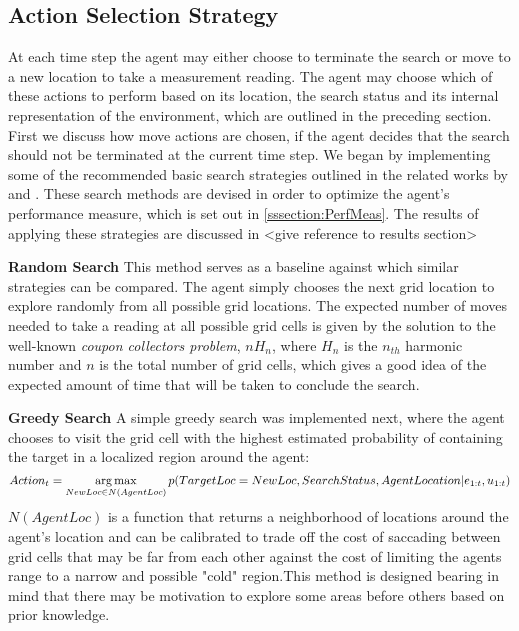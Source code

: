 \subsection{Action Selection Strategy}\label{subsubsec:ActionSelection}
\workinprogress
At each time step the agent may either choose to terminate the search or move to a new location to take a measurement reading. The agent may choose which of these actions to perform based on its location, the search status and its internal representation of the environment, which are outlined in the preceding section. First we discuss how move actions are chosen, if the agent decides that the search should not be terminated at the current time step. We began by implementing some of the recommended basic search strategies outlined in the related works by \citeauthor{Chung2007ASearchb} \cite{Chung2007ASearchb} and \citeauthor{Waharte2010SupportingRAVs} \cite{Waharte2010SupportingRAVs}. These search methods are devised in order to optimize the agent's performance measure, which is set out in \ref{sssection:PerfMeas}. The results of applying these strategies are discussed in <give reference to results section>\par 
{}
\textbf{Random Search}
This method serves as a baseline against which similar strategies can be compared. The agent simply chooses the next grid location to explore randomly from all possible grid locations. The expected number of moves needed to take a reading at all possible grid cells is given by the solution to the well-known \textit{coupon collectors problem}, $nH_n$, where $H_n$ is the $n_{th}$ harmonic number and $n$ is the total number of grid cells, which gives a good idea of the expected amount of time that will be taken to conclude the search.

\textbf{Greedy Search}
A simple greedy search was implemented next, where the agent chooses to visit the grid cell with the highest estimated probability of containing the target in a localized region around the agent:
\footnotesize
\[
Action_t = \operatorname*{arg\,max}_{NewLoc \in N(AgentLoc)}{p(TargetLoc = NewLoc, SearchStatus, AgentLocation| e_{1:t}, u_{1:t})}
\]
\normalsize
$N(AgentLoc)$ is a function that returns a neighborhood of locations around the agent's location and can be calibrated to trade off the cost of saccading between grid cells that may be far from each other against the cost of limiting the agents range to a narrow and possible "cold" region.This method is designed bearing in mind that there may be motivation to explore some areas before others based on prior knowledge. 

